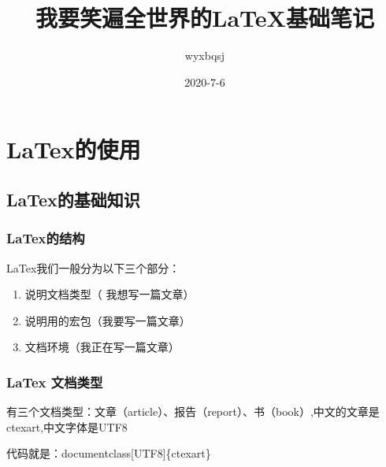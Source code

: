 \documentclass[UTF8]{ctexart}
\begin{document}
	
    \title{\textbf{我要笑遍全世界的\LaTeX 基础笔记}}%
    \author{wyxbqsj}
    \date{2020-7-6} %
    \maketitle %
    
    \section{LaTex的使用}
    \subsection{LaTex的基础知识}
    \subsubsection{LaTex的结构}
    LaTex我们一般分为以下三个部分：
    
    \begin{enumerate}
    	\item 说明文档类型（ 我想写一篇文章）
    	\item 说明用的宏包（我要写一篇文章）
    	\item 文档环境（我正在写一篇文章）
    \end{enumerate}

    \subsubsection{LaTex 文档类型}
    有三个文档类型：文章（article）、报告（report）、书（book）,中文的文章是ctexart,中文字体是UTF8
    
    代码就是：documentclass[UTF8]\{ctexart\} %
    
\end{document}
